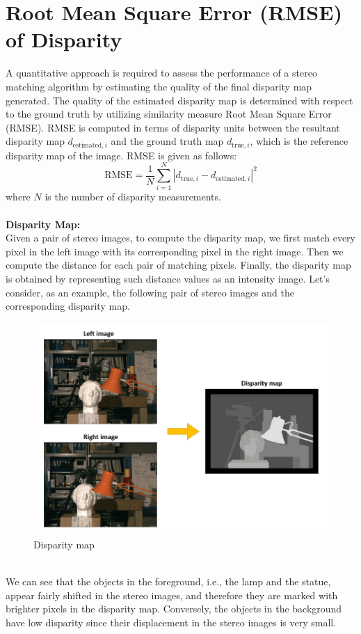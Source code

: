 \documentclass[22pt]{report}
\begin{document}
    \section{Root Mean Square Error (RMSE) of Disparity}
        A quantitative approach is required to assess the performance of a stereo matching algorithm by estimating the quality of the final disparity map generated. The quality of the estimated disparity map is determined with
        respect to the ground truth by utilizing similarity measure Root Mean Square Error (RMSE). RMSE is computed in terms of disparity units between the resultant disparity map $d_{\text{estimated},i}$ and the ground truth map $d_{\text{true},i}$, which is the reference disparity map of the image. RMSE is given as follows:
        \[
        \text{RMSE} = \frac{1}{N} \sum_{i=1}^{N} \left|d_{\text{true},i} - d_{\text{estimated},i}\right|^2
        \]
        where \(N\) is the number of disparity measurements.\\\\
        \textbf{Disparity Map:}\\
        Given a pair of stereo images, to compute the disparity map, we first match every pixel in the left image with its corresponding pixel in the right image. Then we compute the distance for each pair of matching pixels. Finally, the disparity map is obtained by representing such distance values as an intensity image.
        Let’s consider, as an example, the following pair of stereo images and the corresponding disparity map.
        \begin{figure}[h]
            \centering
            \includegraphics[width=0.5\linewidth]{Images/DisparityMap.png}
            \caption{Disparity map}
        \end{figure}\\
        We can see that the objects in the foreground, i.e., the lamp and the statue, appear fairly shifted in the stereo images, and therefore they are marked with brighter pixels in the disparity map. Conversely, the objects in the background have low disparity since their displacement in the stereo images is very small.\\\\
\end{document}
